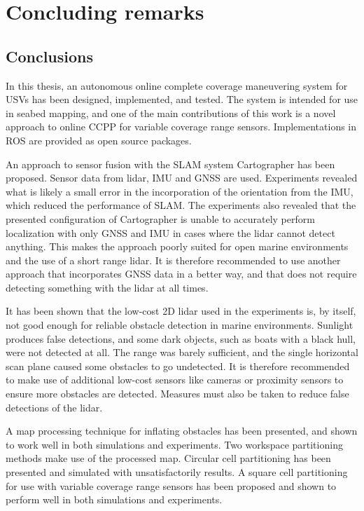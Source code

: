 \chapter{Concluding remarks}

\section{Conclusions}


In this thesis, an autonomous online complete coverage maneuvering system for USVs has been designed, implemented, and tested. The system is intended for use in seabed mapping, and one of the main contributions of this work is a novel approach to online CCPP for variable coverage range sensors. Implementations in ROS are provided as open source packages. 

An approach to sensor fusion with the SLAM system Cartographer has been proposed. Sensor data from lidar, IMU and GNSS are used.
Experiments revealed what is likely a small error in the incorporation of the orientation from the IMU, which reduced the performance of SLAM. The experiments also revealed that the presented configuration of Cartographer is unable to accurately perform localization with only GNSS and IMU in cases where the lidar cannot detect anything. This makes the approach poorly suited for open marine environments and the use of a short range lidar. It is therefore recommended to use another approach that incorporates GNSS data in a better way, and that does not require detecting something with the lidar at all times.

It has been shown that the low-cost 2D lidar used in the experiments is, by itself, not good enough for reliable obstacle detection in marine environments. Sunlight produces false detections, and some dark objects, such as boats with a black hull, were not detected at all. The range was barely sufficient, and the single horizontal scan plane caused some obstacles to go undetected. It is therefore recommended to make use of additional low-cost sensors like cameras or proximity sensors to ensure more obstacles are detected. Measures must also be taken to reduce false detections of the lidar.

A map processing technique for inflating obstacles has been presented, and shown to work well in both simulations and experiments. Two workspace partitioning methods make use of the processed map. Circular cell partitioning has been presented and simulated with unsatisfactorily results. A square cell partitioning for use with variable coverage range sensors has been proposed and shown to perform well in both simulations and experiments.


